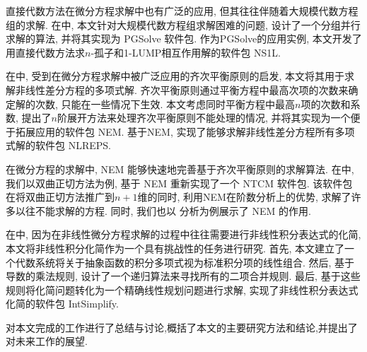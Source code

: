 直接代数方法在微分方程求解中也有广泛的应用, 但其往往伴随着大规模代数方程组的求解. 在中, 本文针对大规模代数方程组求解困难的问题, 设计了一个分组并行求解的算法, 并将其实现为 PGSolve 软件包. 作为PGSolve的应用实例, 本文开发了用直接代数方法求$n$-孤子和1-LUMP相互作用解的软件包 NS1L. 

在中, 受到在微分方程求解中被广泛应用的齐次平衡原则的启发, 本文将其用于求解非线性差分方程的多项式解. 齐次平衡原则通过平衡方程中最高次项的次数来确定解的次数, 只能在一些情况下生效. 本文考虑同时平衡方程中最高$n$项的次数和系数, 提出了$n$阶展开方法来处理齐次平衡原则不能处理的情况, 并将其实现为一个便于拓展应用的软件包 NEM. 基于NEM, 实现了能够求解非线性差分方程所有多项式解的软件包 NLREPS. 

在微分方程的求解中, NEM 能够快速地完善基于齐次平衡原则的求解算法. 在中, 我们以双曲正切方法为例, 基于 NEM 重新实现了一个 NTCM 软件包. 该软件包在将双曲正切方法推广到$n+1$维的同时, 利用NEM在阶数分析上的优势, 求解了许多以往不能求解的方程. 同时, 我们也以 \Painleve{} 分析为例展示了 NEM 的作用. 

在中, 因为在非线性微分方程求解的过程中往往需要进行非线性积分表达式的化简, 本文将非线性积分化简作为一个具有挑战性的任务进行研究. 首先, 本文建立了一个代数系统将关于抽象函数的积分多项式视为标准积分项的线性组合. 然后, 基于导数的乘法规则, 设计了一个递归算法来寻找所有的二项合并规则. 最后, 基于这些规则将化简问题转化为一个精确线性规划问题进行求解, 实现了非线性积分表达式化简的软件包 IntSimplify. 

对本文完成的工作进行了总结与讨论,概括了本文的主要研究方法和结论,并提出了对未来工作的展望.
